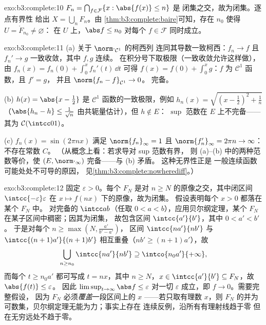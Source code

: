 \begin{solution}{exo:b3:complete:10}
$F_n = \bigcap_{f \in \mathcal F}\{x : \abs{f(x)} \leq n\}$ 是
闭集之交，故为闭集。逐点有界性
给出 $X = \bigcup_n F_n$。由
\cref{thm:b3:complete:baire}可知，存在 $n_0$ 使得 $U = \mathring F_{n_0} \neq \varnothing$：
在 $U$ 上，$\abs f \leq n_0$ 对每个 $f \in \mathcal F$
同时成立。
\end{solution}

\begin{solution}{exo:b3:complete:11}
(a) 关于 $\norm\cdot_{\mathcal C^1}$ 的柯西列
连同其导数一致柯西：$f_n \to f$
且 $f_n' \to g$ 一致收敛，其中 $f, g$ 连续。
在积分号下取极限（一致收敛允许这样做），由
$f_n(x) = f_n(0) + \int_0^xf_n'(t)\,\dd t$ 可得
$f(x) = f(0) + \int_0^xg$：$f$ 为 $\mathcal C^1$ 函数，且 $f' = g$，
并且 $\norm{f_n - f}_{\mathcal C^1} \to 0$。
完备。

(b) $h(x) = \abs{x - \frac12}$ 是
$\mathcal C^1$ 函数的一致极限，例如 $h_n(x) = \sqrt{(x -
\frac12)^2 + \frac1n}$（$\abs{h_n - h} \leq \frac1{\sqrt n}$
由共轭量估计），但 $h \notin E$：
$\sup$ 范数在 $E$ 上不完备——其为
$\mathcal C(\intcc01)$。

(c) $f_n(x) = \sin(2\pi nx)$ 满足 $\norm{f_n}_\infty = 1$ 且
$\norm{f_n'}_\infty = 2\pi n \to \infty$：不存在常数 $C$。
（从概念上看：若求导对 sup 范数有界，
则 (a)--(b) 中的两种范数等价，使
$(E, \norm\cdot_\infty)$ 完备——与 (b) 矛盾。
这种无界性正是
一般连续函数可能处处不可导的原因，
见\cref{thm:b3:complete:nowherediff}。）
\end{solution}

\begin{solution}{exo:b3:complete:12}
固定 $\varepsilon > 0$。每个 $F_N$ 是对 $n
\geq N$ 的原像之交，其中闭区间 $\intcc{-\varepsilon}
\varepsilon$ 在 $x \mapsto f(nx)$ 下的原像，故为闭集。
假设表明每个 $x > 0$ 都落在某个 $F_N$ 中。
对完备的 $\intcc ab$（任取 $0 < a <
b$），应用贝尔纲定理，某个 $F_N$ 在某子区间中稠密；因其为闭集，
故包含区间 $\intcc{a'}{b'}$，其中 $0 < a' < b'$。
于是对每个 $n \geq \max(N, \frac{a'}{b' - a'})$，
区间 $\intcc{na'}{nb'}$ 与 $\intcc{(n+1)a'}{(n+1)b'}$
相互重叠（$nb' \geq (n+1)a'$），故
\[
\bigcup_{n \geq n_0}\intcc{na'}{nb'} \supseteq
\intco{n_0a'}{+\infty},
\]
而每个 $t \geq n_0a'$ 都可写成 $t = nx$，其中 $n \geq N$，$x \in
\intcc{a'}{b'} \subseteq F_N$，故 $\abs{f(t)} \leq \varepsilon$。
因此 $\limsup_{t\to\infty}\abs f \leq \varepsilon$ 对一切
$\varepsilon$ 成立，即 $f \to 0$。需要完整假设，
因为 $F_N$ 必须\emph{覆盖}一段区间上的 $x$
——若只取有理数 $x$，则 $F_N$ 的并为
可数集，贝尔纲定理无能为力；事实上存在
连续反例，沿所有有理射线趋于零
但在无穷远处不趋于零。
\end{solution}

